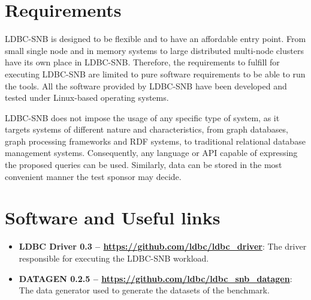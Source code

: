 

\section{Requirements}

LDBC-SNB is designed to be flexible and to have an affordable entry point.
From small single node and in memory systems to large distributed multi-node
clusters have its own place in LDBC-SNB.  Therefore, the requirements to
fulfill for executing LDBC-SNB are limited to pure software requirements to be
able to run the tools. All the software provided by LDBC-SNB have been
developed and tested under Linux-based operating systems.

LDBC-SNB does not impose the usage of any specific type of system, as it
targets systems of different nature and characteristics, from graph databases,
graph processing frameworks and RDF systems, to traditional relational database
management systems. Consequently, any language or API capable of expressing the
proposed queries can be used. Similarly, data can be stored in the most
convenient manner the test sponsor may decide.


\section{Software and Useful links} 

\begin{itemize}
    \item \textbf{LDBC Driver 0.3 -- \url{https://github.com/ldbc/ldbc_driver}}: The driver
    responsible for executing the LDBC-SNB workload.
    \item \textbf{DATAGEN 0.2.5 -- \url{https://github.com/ldbc/ldbc_snb_datagen}}: The data
    generator used to generate the datasets of the benchmark.
\end{itemize}





